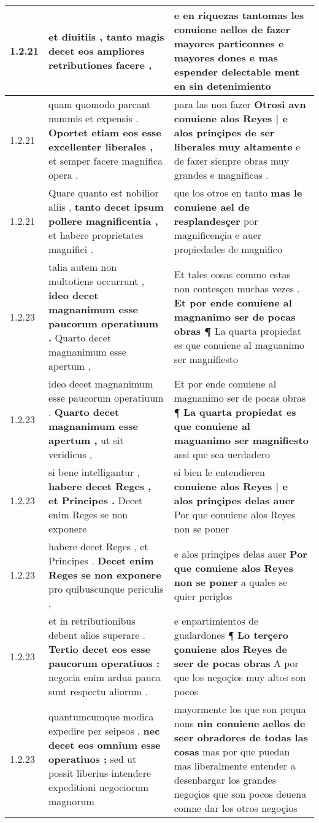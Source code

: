 \begin{tabular}{|p{1cm}|p{6.5cm}|p{6.5cm}|}
1.2.21 & et diuitiis , \textbf{ tanto magis decet } eos ampliores retributiones facere , & e en riquezas \textbf{ tantomas les conuiene aellos de fazer mayores particonnes e mayores dones } e mas espender delectable ment en sin detenimiento \\\hline
1.2.21 & quam quomodo parcant nummis et expensis . \textbf{ Oportet etiam eos esse excellenter liberales , } et semper facere magnifica opera . & para las non fazer \textbf{ Otrosi avn conuiene alos Reyes | e alos prinçipes de ser liberales muy altamente } e de fazer sienpre obras muy grandes e magnificas . \\\hline
1.2.21 & Quare quanto est nobilior aliis , \textbf{ tanto decet ipsum pollere magnificentia , } et habere proprietates magnifici . & que los otros en tanto \textbf{ mas le conuiene ael de resplandesçer } por magnificençia e auer propiedades de magnifico \\\hline
1.2.23 & talia autem non multotiens occurrunt , \textbf{ ideo decet magnanimum esse paucorum operatiuum . } Quarto decet magnanimum esse apertum , & Et tales cosas commo estas non contesçen muchas vezes . \textbf{ Et por ende conuiene al magnanimo ser de pocas obras ¶ } La quarta propiedat es que conuiene al maguanimo ser magnifiesto \\\hline
1.2.23 & ideo decet magnanimum esse paucorum operatiuum . \textbf{ Quarto decet magnanimum esse apertum , } ut sit veridicus , & Et por ende conuiene al magnanimo ser de pocas obras ¶ \textbf{ La quarta propiedat es que conuiene al maguanimo ser magnifiesto } assi que sea uerdadero \\\hline
1.2.23 & si bene intelligantur , \textbf{ habere decet Reges , et Principes . } Decet enim Reges se non exponere & si bien le entendieren \textbf{ conuiene alos Reyes | e alos prinçipes delas auer } Por que conuiene alos Reyes non se poner \\\hline
1.2.23 & habere decet Reges , et Principes . \textbf{ Decet enim Reges se non exponere } pro quibuscunque periculis , & e alos prinçipes delas auer \textbf{ Por que conuiene alos Reyes non se poner } a quales se quier periglos \\\hline
1.2.23 & et in retributionibus debent alios superare . \textbf{ Tertio decet eos esse paucorum operatiuos : } negocia enim ardua pauca sunt respectu aliorum . & e enpartimientos de gualardones ¶ \textbf{ Lo terçero çonuiene alos Reyes de seer de pocas obras } A por que los negoçios muy altos son pocos \\\hline
1.2.23 & quantumcumque modica expedire per seipsos , \textbf{ nec decet eos omnium esse operatiuos ; } sed ut possit liberius intendere expeditioni negociorum magnorum & mayormente los que son pequa nons \textbf{ nin conuiene aellos de seer obradores de todas las cosas } mas por que puedan mas liberalmente entender a desenbargar los grandes negoçios que son pocos deuena comne dar los otros negoçios \\\hline

\end{tabular}
